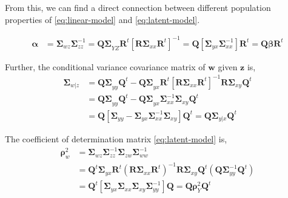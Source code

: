 \documentclass[3p,times,12pt,authoryear]{elsarticle}
\providecommand{\tightlist}{%
  \setlength{\itemsep}{0pt}\setlength{\parskip}{0pt}}
\theoremstyle{definition}
\theoremstyle{definition}
\theoremstyle{remark}
\begin{document}
From this, we can find a direct connection between different population
properties of \eqref{eq:linear-model} and \eqref{eq:latent-model}.

\begin{description}
\tightlist
\item[Regression Coefficients]
\[
  \begin{aligned}
  \boldsymbol{\alpha} &= \boldsymbol{\Sigma}_{wz} \boldsymbol{\Sigma}_{zz}^{-1}
  = \boldsymbol{Q\Sigma}_{YZ}\mathbf{R}^t\left[\boldsymbol{R\Sigma}_{xx}\mathbf{R}^t\right]^{-1}
  = \mathbf{Q}\left[\boldsymbol{\Sigma}_{yx}\boldsymbol{\Sigma}_{xx}^{-1}\right]\mathbf{R}^t
  = \mathbf{Q}\boldsymbol{\beta}\mathbf{R}^t
  \end{aligned}
  \]
\item[Conditional Variance]
Further, the conditional variance covariance matrix of \(\mathbf{w}\)
given \(\mathbf{z}\) is, \[
  \begin{aligned}
\boldsymbol{\Sigma}_{w|z}
&= \boldsymbol{Q\Sigma}_{yy}\mathbf{Q}^t -
  \boldsymbol{Q \Sigma}_{yx}\mathbf{R}^t \left[\boldsymbol{R\Sigma}_{xx}\boldsymbol{R}^t\right]^{-1}
  \boldsymbol{R\Sigma}_{xy}\mathbf{Q}^t \nonumber \\
&= \boldsymbol{Q\Sigma}_{yy}\mathbf{Q}^t - 
  \boldsymbol{Q \Sigma}_{yx}\boldsymbol{\Sigma}_{xx}^{-1}\boldsymbol{\Sigma}_{xy}\mathbf{Q}^t \\
&= \mathbf{Q}\left[\boldsymbol{\Sigma}_{yy} -
  \boldsymbol{\Sigma}_{yx}\boldsymbol{\Sigma}_{xx}^{-1}\boldsymbol{\Sigma}_{xy}\right]\mathbf{Q}^{t}
= \mathbf{Q} \boldsymbol{\Sigma}_{y|x}\mathbf{Q}^t
  \end{aligned}
  \]
\item[Coefficient of Determination]
The coefficient of determination matrix \eqref{eq:latent-model} is, \[
  \begin{aligned}
\boldsymbol{\rho}^2_w &= \boldsymbol{\Sigma}_{wz} 
\boldsymbol{\Sigma}_{zz}^{-1} \boldsymbol{\Sigma}_{zw} 
\boldsymbol{\Sigma}_{ww}^{-1} \\
  &=\mathbf{Q}^t
  \boldsymbol{\Sigma}_{yx}\mathbf{R}^t \left(\mathbf{R}\boldsymbol{\Sigma}_{xx}\mathbf{R}^t\right)^{-1}
  \mathbf{R}\boldsymbol{\Sigma}_{xy}\mathbf{Q}^t \left(\mathbf{Q} \boldsymbol{\Sigma}_{yy}^{-1} \mathbf{Q}^t\right) \nonumber \\
  &=\mathbf{Q}^t\left[\boldsymbol{\Sigma}_{yx}\boldsymbol{\Sigma}_{xx}\boldsymbol{\Sigma}_{xy}\boldsymbol{\Sigma}_{yy}^{-1}\right]\mathbf{Q}
  = \mathbf{Q}\boldsymbol{\rho}_{Y}^2 \mathbf{Q}^t
  \end{aligned}
  \]
\end{description}
\end{document}
